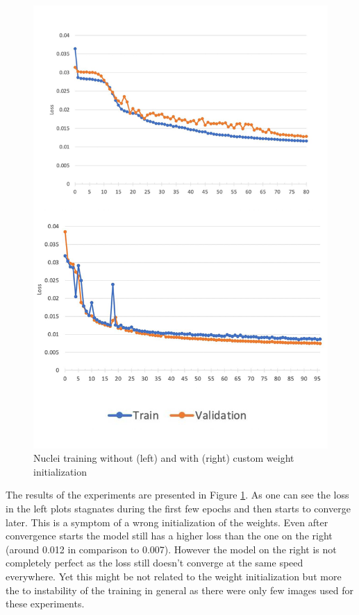 \begin{figure}[H]
	\begin{center}
		\includegraphics[width=\linewidth]{bilder/nuclei/wi-no-wi.png}
		\caption{Nuclei training without (left) and with (right) custom weight initialization}\label{fig:wi}
	\end{center}
\end{figure}

The results of the experiments are presented in Figure \ref{fig:wi}. As one can see the loss in the left plots stagnates during the first few epochs and then starts to converge later. This is a symptom of a wrong initialization of the weights. Even after convergence starts the model still has a higher loss than the one on the right (around 0.012 in comparison to 0.007). However the model on the right is not completely perfect as the loss still doesn't converge at the same speed everywhere. Yet this might be not related to the weight initialization but more the to instability of the training in general as there were only few images used for these experiments.
